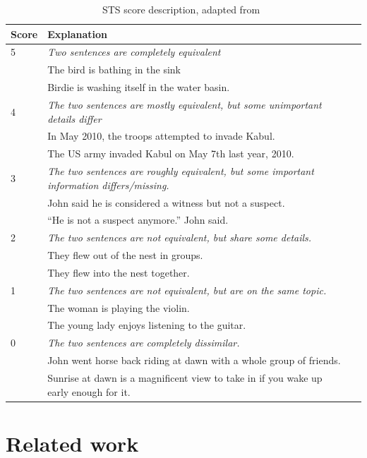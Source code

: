 \documentclass[10pt, a4paper]{article}
\begin{document}
\begin{table}
\caption{STS score description, adapted from~\citep{agirre2016semeval}}
\label{tab:sts-score}
\begin{center}
\begin{tabular}{llr}
\toprule
Score & Explanation\\
\midrule
5 & \textit{Two sentences are completely equivalent}\\
& The bird is bathing in the sink\\
& Birdie is washing itself in the water basin.\\
\midrule
4 & \textit{The two sentences are mostly equivalent, but some unimportant details differ}\\
& In May 2010, the troops attempted to invade
Kabul. \\
& The US army invaded Kabul on May 7th last
year, 2010.\\
\midrule
3 & \textit{The two sentences are roughly equivalent, but some important information differs/missing.}\\
& John said he is considered a witness but not a
suspect.\\
& ``He is not a suspect anymore.'' John said.\\
\midrule
2 & \textit{The two sentences are not equivalent, but share some details.} \\
&They flew out of the nest in groups. \\
&They flew into the nest together. \\
\midrule
1 & \textit{The two sentences are not equivalent, but are on the same topic.}\\
& The woman is playing the violin.\\
& The young lady enjoys listening to the guitar.\\
\midrule
0 & \textit{The two sentences are completely dissimilar.}\\
& John went horse back riding at dawn with a whole group of friends.\\
& Sunrise at dawn is a magnificent view to take in if you wake up early enough for it.\\
\bottomrule
\end{tabular}
\end{center}
\end{table}

\section{Related work}
\end{document}
